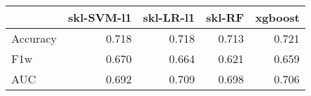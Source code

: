 \begin{tabular}{lrrrr}
\toprule
{} &  skl-SVM-l1 &  skl-LR-l1 &  skl-RF &  xgboost \\
\midrule
Accuracy &       0.718 &      0.718 &   0.713 &    0.721 \\
F1w      &       0.670 &      0.664 &   0.621 &    0.659 \\
AUC      &       0.692 &      0.709 &   0.698 &    0.706 \\
\bottomrule
\end{tabular}
